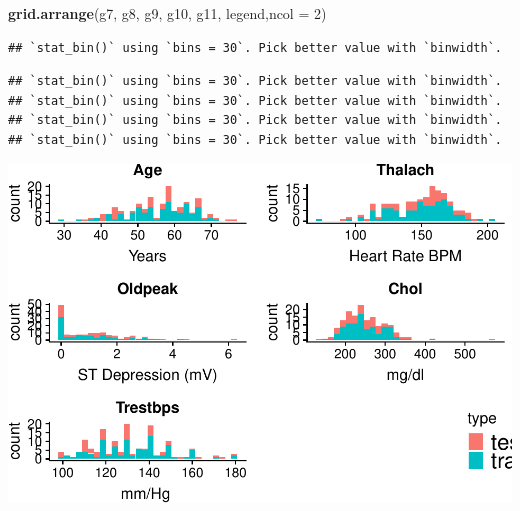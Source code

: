 \documentclass[]{article}
\newenvironment{Shaded}{\begin{snugshade}}{\end{snugshade}}
\newcommand{\KeywordTok}[1]{\textcolor[rgb]{0.13,0.29,0.53}{\textbf{#1}}}
\newcommand{\DataTypeTok}[1]{\textcolor[rgb]{0.13,0.29,0.53}{#1}}
\newcommand{\DecValTok}[1]{\textcolor[rgb]{0.00,0.00,0.81}{#1}}
\newcommand{\NormalTok}[1]{#1}
\begin{document}
\begin{Shaded}
\begin{Highlighting}[]
\KeywordTok{grid.arrange}\NormalTok{(g7, g8, g9, g10, g11, legend,}\DataTypeTok{ncol =} \DecValTok{2}\NormalTok{)}
\end{Highlighting}
\end{Shaded}

\begin{verbatim}
## `stat_bin()` using `bins = 30`. Pick better value with `binwidth`.
\end{verbatim}

\begin{verbatim}
## `stat_bin()` using `bins = 30`. Pick better value with `binwidth`.
## `stat_bin()` using `bins = 30`. Pick better value with `binwidth`.
## `stat_bin()` using `bins = 30`. Pick better value with `binwidth`.
## `stat_bin()` using `bins = 30`. Pick better value with `binwidth`.
\end{verbatim}

\includegraphics{project_report_files/figure-latex/unnamed-chunk-38-1.pdf}
\end{document}
